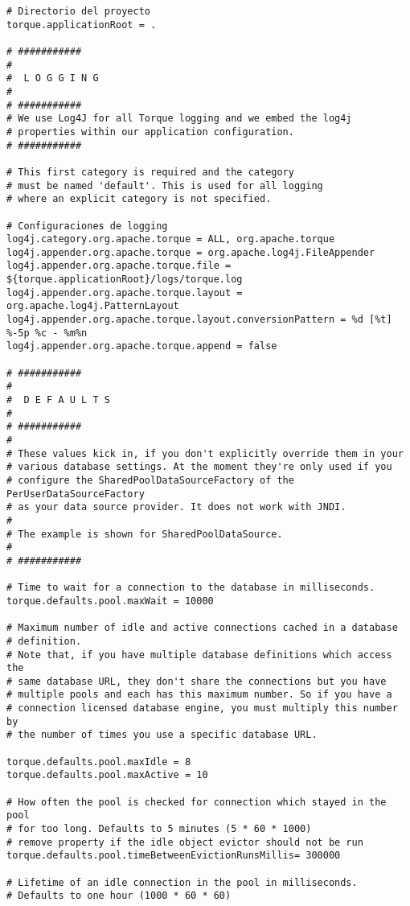 \begin{lstlisting}
# Directorio del proyecto
torque.applicationRoot = .

# ###########
#
#  L O G G I N G
#
# ###########
# We use Log4J for all Torque logging and we embed the log4j
# properties within our application configuration.
# ###########

# This first category is required and the category
# must be named 'default'. This is used for all logging
# where an explicit category is not specified.

# Configuraciones de logging
log4j.category.org.apache.torque = ALL, org.apache.torque
log4j.appender.org.apache.torque = org.apache.log4j.FileAppender
log4j.appender.org.apache.torque.file = ${torque.applicationRoot}/logs/torque.log
log4j.appender.org.apache.torque.layout = org.apache.log4j.PatternLayout
log4j.appender.org.apache.torque.layout.conversionPattern = %d [%t] %-5p %c - %m%n
log4j.appender.org.apache.torque.append = false

# ###########
#
#  D E F A U L T S
#
# ###########
#
# These values kick in, if you don't explicitly override them in your
# various database settings. At the moment they're only used if you
# configure the SharedPoolDataSourceFactory of the PerUserDataSourceFactory
# as your data source provider. It does not work with JNDI.
#
# The example is shown for SharedPoolDataSource.
#
# ###########

# Time to wait for a connection to the database in milliseconds.
torque.defaults.pool.maxWait = 10000

# Maximum number of idle and active connections cached in a database
# definition.
# Note that, if you have multiple database definitions which access the
# same database URL, they don't share the connections but you have
# multiple pools and each has this maximum number. So if you have a
# connection licensed database engine, you must multiply this number by
# the number of times you use a specific database URL.

torque.defaults.pool.maxIdle = 8
torque.defaults.pool.maxActive = 10

# How often the pool is checked for connection which stayed in the pool
# for too long. Defaults to 5 minutes (5 * 60 * 1000)
# remove property if the idle object evictor should not be run
torque.defaults.pool.timeBetweenEvictionRunsMillis= 300000

# Lifetime of an idle connection in the pool in milliseconds.
# Defaults to one hour (1000 * 60 * 60)


\end{lstlisting}
